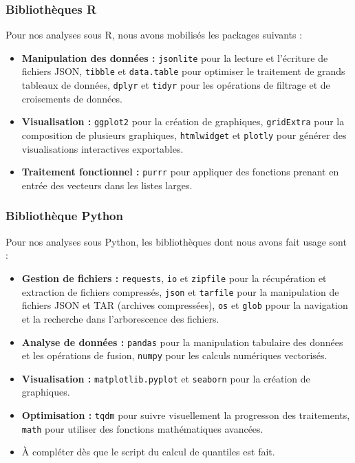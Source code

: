 \documentclass[a4paper,12pt]{article}
\begin{document}
\subsubsection{Bibliothèques R}

Pour nos analyses sous R, nous avons mobilisés les packages suivants :
\begin{itemize}
    \item \textbf{Manipulation des données :} \texttt{jsonlite} pour la lecture et l'écriture de fichiers JSON, \texttt{tibble} et \texttt{data.table} pour optimiser le traitement de grands tableaux de données, \texttt{dplyr} et \texttt{tidyr} pour les opérations de filtrage et de croisements de données.
    \item \textbf{Visualisation :} \texttt{ggplot2} pour la création de graphiques, \texttt{gridExtra} pour la composition de plusieurs graphiques, \texttt{htmlwidget} et \texttt{plotly} pour générer des visualisations interactives exportables.
    \item \textbf{Traitement fonctionnel :} \texttt{purrr} pour appliquer des fonctions prenant en entrée des vecteurs dans les listes larges.
\end{itemize}

\subsubsection{Bibliothèque Python}

Pour nos analyses sous Python, les bibliothèques dont nous avons fait usage sont :
\begin{itemize}
    \item \textbf{Gestion de fichiers :} \texttt{requests}, \texttt{io}  et \texttt{zipfile} pour la récupération et extraction de fichiers compressés, \texttt{json} et \texttt{tarfile} pour la manipulation de fichiers JSON et TAR (archives compressées), \texttt{os} et \texttt{glob} ppour la navigation et la recherche dans l'arborescence des fichiers.
    \item \textbf{Analyse de données :} \texttt{pandas} pour la manipulation tabulaire des données et les opérations de fusion, \texttt{numpy} pour les calculs numériques vectorisés.
    \item \textbf{Visualisation :} \texttt{matplotlib.pyplot} et \texttt{seaborn} pour la création de graphiques.
    \item \textbf{Optimisation :} \texttt{tqdm} pour suivre visuellement la progresson des traitements, \texttt{math} pour utiliser des fonctions mathématiques avancées.
    \item À compléter dès que le script du calcul de quantiles est fait. 
\end{itemize}
\end{document}

